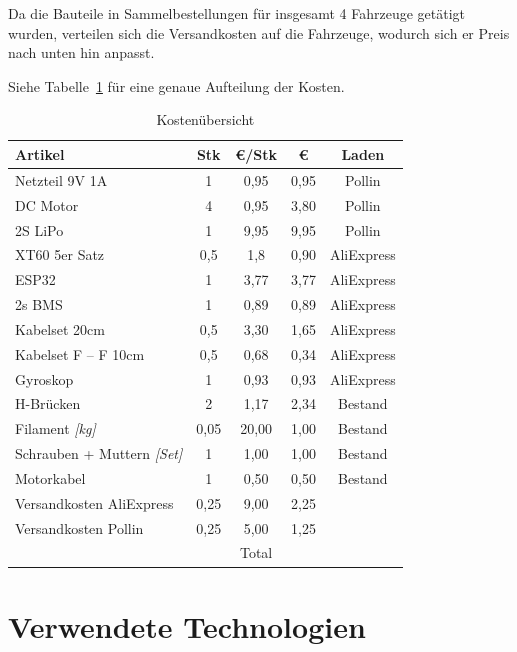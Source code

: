 Da die Bauteile in Sammelbestellungen für insgesamt 4 Fahrzeuge getätigt wurden, verteilen sich die Versandkosten auf die Fahrzeuge, wodurch sich er Preis nach unten hin anpasst. 

Siehe Tabelle~\ref{table:Kosten} für eine genaue Aufteilung der Kosten.
\begin{table}[!ht]
	\centering
\begin{tabular}{lcccc}
	Artikel & Stk & \euro/Stk & \euro{} & Laden\\
	\midrule[2pt]
	Netzteil 9V 1A & 1 & 0,95 & 0,95 & Pollin\\
	\midrule
	DC Motor & 4 & 0,95 & 3,80 & Pollin\\
	\midrule
	2S LiPo & 1 & 9,95 & 9,95 & Pollin\\
	\midrule
	XT60 5er Satz & 0,5 & 1,8 & 0,90 & AliExpress\\
	\midrule
	ESP32 & 1 & 3,77 & 3,77 & AliExpress\\
	\midrule
	2s BMS & 1 & 0,89 & 0,89 & AliExpress\\
	\midrule
	Kabelset 20cm & 0,5 & 3,30 & 1,65 & AliExpress\\
	\midrule
	Kabelset F -- F 10cm & 0,5 & 0,68 & 0,34 & AliExpress\\
	\midrule
	Gyroskop & 1 & 0,93 & 0,93 & AliExpress\\
	\midrule
	H-Brücken & 2 & 1,17 & 2,34 & Bestand\\
	\midrule
	Filament \textit{[kg]} & 0,05 & 20,00 & 1,00 & Bestand\\
	\midrule
	Schrauben + Muttern \textit{[Set]} & 1 & 1,00 & 1,00 & Bestand\\
	\midrule
	Motorkabel & 1 & 0,50 & 0,50 & Bestand\\
	\midrule
	Versandkosten AliExpress & 0,25 & 9,00 & 2,25 & \\
	\midrule
	Versandkosten Pollin & 0,25 & 5,00 & 1,25 & \\
	\midrule
	\midrule
	 &  & Total & \EUR{31,52} & \\
\end{tabular} 
\caption{Kostenübersicht} 
\label{table:Kosten}
\end{table} 

\section{Verwendete Technologien}

